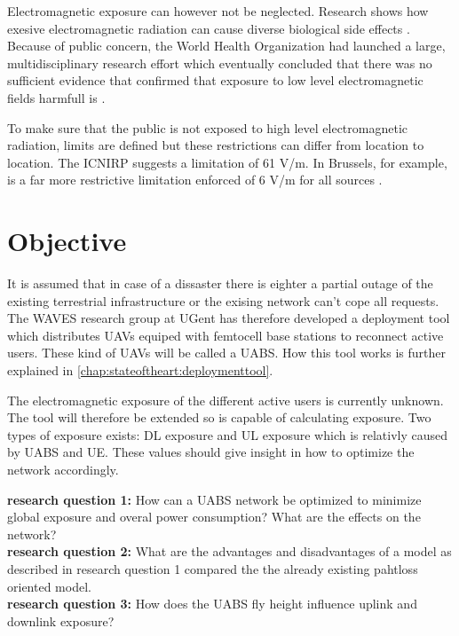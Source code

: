 Electromagnetic exposure can however not be neglected. Research shows how exesive electromagnetic radiation can cause diverse biological side effects \cite{bioeffects}.
Because of public concern, the World Health Organization had launched a large, multidisciplinary research effort which eventually concluded that there was no sufficient evidence that confirmed 
that exposure to low level electromagnetic fields harmfull is \cite{WHO}. 

To make sure that the public is not exposed to high level electromagnetic radiation, limits are defined but these restrictions can differ from location to location.
The \gls{ICNIRP} suggests a limitation of 61 V/m. In Brussels, for example, is a far more restrictive limitation enforced of 6 V/m for all sources \cite{J1, J5}.

\section{Objective}
\label{sec:objective}

It is assumed that in case of a dissaster there is eighter a partial outage of the existing terrestrial infrastructure or the exising network can't cope all requests.
The WAVES research group at UGent has therefore developed a deployment tool which distributes UAVs equiped with femtocell base stations to reconnect active users. These kind of UAVs will be called 
a \gls{UABS}. How this tool works is further explained in \ref{chap:stateoftheart:deploymenttool}.

The electromagnetic exposure of the different active users is currently unknown. The tool will therefore be extended so is capable of calculating exposure.
Two types of exposure exists: \gls{DL} exposure and \gls{UL} exposure which is relativly caused by \gls{UABS} and \gls{UE}. These values should give insight in how
to optimize the network accordingly.

\textbf{research question 1:} How can a \gls{UABS} network be optimized to minimize global exposure and overal power consumption? What are the effects on the network?\\

\textbf{research question 2:} What are the advantages and disadvantages of a model as described in research question 1 compared the the already existing pahtloss oriented model.\\

\textbf{research question 3:} How does the \gls{UABS} fly height influence uplink and downlink exposure?


